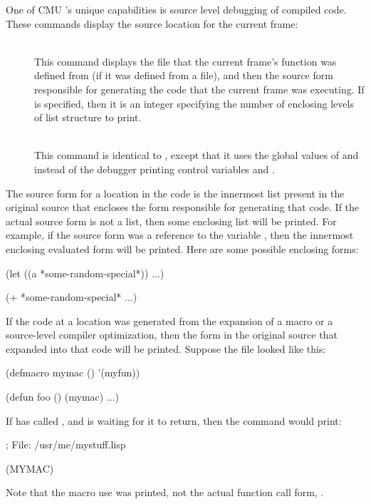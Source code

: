 One of CMU \clisp{}'s unique capabilities is source level debugging of compiled
code.  These commands display the source location for the current frame:
\begin{description}

\item[ ]\hfill\\
This command displays the file that the current frame's function was defined
from (if it was defined from a file), and then the source form responsible for
generating the code that the current frame was executing.  If  is
specified, then it is an integer specifying the number of enclosing levels of
list structure to print.

\item[ ]\hfill\\
This command is identical to , except that it uses the
global values of  and  instead
of the debugger printing control variables 
and .
\end{description}

The source form for a location in the code is the innermost list present
in the original source that encloses the form responsible for generating
that code.  If the actual source form is not a list, then some enclosing
list will be printed.  For example, if the source form was a reference
to the variable , then the innermost
enclosing evaluated form will be printed.  Here are some possible
enclosing forms:
\begin{example}
(let ((a *some-random-special*))
  ...)

(+ *some-random-special* ...)
\end{example}

If the code at a location was generated from the expansion of a macro or a
source-level compiler optimization, then the form in the original source that
expanded into that code will be printed.  Suppose the file
 looked like this:
\begin{example}
(defmacro mymac ()
  '(myfun))

(defun foo ()
  (mymac)
  ...)
\end{example}
If  has called , and is waiting for it to return, then the
 command would print:
\begin{example}
; File: /usr/me/mystuff.lisp

(MYMAC)
\end{example}
Note that the macro use was printed, not the actual function call form,
.


